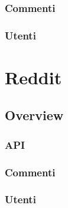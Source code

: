 \subsubsection {Commenti}
\subsubsection {Utenti}



\section {Reddit} %

\subsection {Overview}
\subsubsection {API}

\subsubsection {Commenti}
\subsubsection {Utenti}
